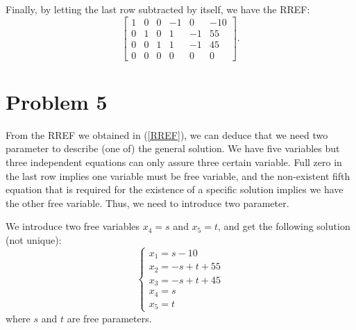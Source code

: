 \documentclass[12pt,a4paper]{article}
\begin{document}
\begin{solution}
Finally, by letting the last row subtracted by itself, we have the RREF:
\begin{equation}\label{RREF}
\left[ \begin{array}{ccccc|c}
1 & 0 & 0 & -1 & 0 & -10 \\
0 & 1 & 0 & 1 & -1 & 55 \\
0 & 0 & 1 & 1 & -1 & 45 \\
0 & 0 & 0 & 0 & 0 & 0 
\end{array} \right].
\end{equation}
\end{solution}

\section*{Problem 5}
\begin{solution}
From the RREF we obtained in (\ref{RREF}), we can deduce that we need two parameter to describe (one of) the general solution. We have five variables but three independent equations can only assure three certain variable. Full zero in the last row implies one variable must be free variable, and the non-existent fifth equation that is required for the existence of a specific solution implies we have the other free variable. Thus, we need to introduce two parameter.

We introduce two free variables \( x_4= s \) and \( x_5=t \), and get the following solution (not unique):
\[
\begin{cases}
x_1 = s - 10 \\
x_2 = -s + t + 55 \\
x_3 = -s + t + 45 \\
x_4 = s \\
x_5 = t
\end{cases}
\]
where \( s \) and \( t \) are free parameters.


\end{solution}
\end{document}
